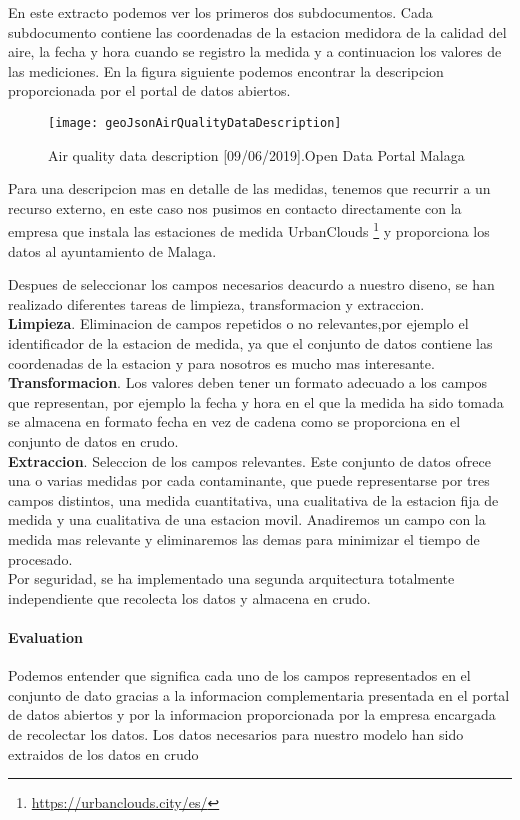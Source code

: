 En este extracto podemos ver los primeros dos subdocumentos. Cada subdocumento contiene las coordenadas de la estacion medidora de la calidad
del aire, la fecha y hora cuando se registro la medida y a continuacion los valores de las mediciones. 
En la figura siguiente podemos encontrar la descripcion proporcionada por el portal de datos abiertos.
\begin{figure}[ht]
    \centering
    \texttt{[image: geoJsonAirQualityDataDescription]}
    \caption{Air quality data description [09/06/2019].Open Data Portal Malaga}
\end{figure}


Para una descripcion mas en detalle de las medidas, tenemos que recurrir a un recurso externo, en este caso nos pusimos en contacto directamente con
la empresa que instala las estaciones de medida UrbanClouds \footnote{\url{https://urbanclouds.city/es/}} y proporciona los datos al ayuntamiento de Malaga.

Despues de seleccionar los campos necesarios deacurdo a nuestro diseno, se han realizado diferentes tareas de limpieza, transformacion y extraccion.\\

\textbf{Limpieza}.  Eliminacion de campos repetidos o no relevantes,por ejemplo el identificador de la estacion de medida, ya que el conjunto de datos
contiene las coordenadas de la estacion y para nosotros es mucho mas interesante.\\

\textbf{Transformacion}. Los valores deben tener un formato adecuado a los campos que representan, por ejemplo la fecha y hora en el que la medida ha sido tomada se almacena en formato fecha
en vez de cadena como se proporciona en el conjunto de datos en crudo.\\

\textbf{Extraccion}. Seleccion de los campos relevantes. Este conjunto de datos ofrece una o varias medidas por cada contaminante, que puede representarse por tres campos distintos, una medida 
cuantitativa, una cualitativa de la estacion fija de medida y una cualitativa de una estacion movil. Anadiremos un campo con la medida
mas relevante y eliminaremos las demas para minimizar el tiempo de procesado.\\

Por seguridad, se ha implementado una segunda arquitectura totalmente independiente que recolecta los datos y almacena en crudo.


\paragraph{Evaluation} \mbox{} 
\begin{itemize}
    \done Podemos entender  que significa cada uno de los campos representados en el conjunto de dato gracias a la informacion
    complementaria presentada en el portal de datos abiertos y por la informacion proporcionada por la empresa encargada de 
    recolectar los datos.
    \done Los datos necesarios para nuestro modelo han sido extraidos de los datos en crudo
    
\end{itemize}
\newpage
